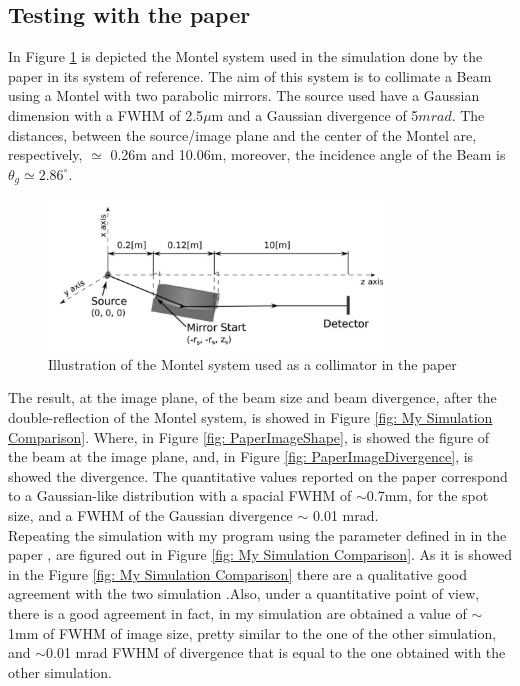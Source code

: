 \subsection{Testing with the paper} 
In Figure \ref{fig: PaperMontelSystem} is depicted the Montel system used in the simulation done by the paper in its system of reference. The aim of this system is to collimate a Beam using a Montel with two parabolic mirrors. The source used have a Gaussian dimension with a FWHM of 2.5$\mu $m and a Gaussian divergence of 5$mrad $. The distances, between the source/image plane and the center of the Montel are, respectively,  $\simeq $ 0.26m and 10.06m, moreover, the incidence angle of the Beam is $\theta_g \simeq 2.86^{\circ} $.
%
\begin{figure}[]
	\centering
		\includegraphics[width=0.8\textwidth]{Immagini/Chapter4/PaperMontelSystem}
		\caption{Illustration of the Montel system used as a collimator in the paper \cite{resta2015nested}}
		\label{fig: PaperMontelSystem}
\end{figure}
%
The result, at the image plane, of the beam size and beam divergence, after the double-reflection of the Montel system, is showed in Figure \ref{fig: My Simulation Comparison}. Where, in Figure \ref{fig: PaperImageShape}, is showed the figure of the beam at the image plane, and, in Figure \ref{fig: PaperImageDivergence}, is showed the divergence. The quantitative values reported on the paper correspond to a Gaussian-like distribution with a spacial FWHM of $\sim $0.7mm, for the spot size, and a FWHM of the Gaussian divergence $\sim $ 0.01 mrad.
\\
Repeating the simulation with my program using the parameter defined in  in the paper \cite{resta2015nested}, are figured out in Figure \ref{fig: My Simulation Comparison}. As it is showed in the Figure \ref{fig: My Simulation Comparison} there are a qualitative good agreement with the two simulation .Also, under a quantitative point of view, there is a good agreement in fact, in my simulation are obtained a value of $\sim $1mm of FWHM of image size, pretty similar to the one of the other simulation, and $\sim $0.01 mrad FWHM of divergence that is equal to the one obtained with the other simulation.
